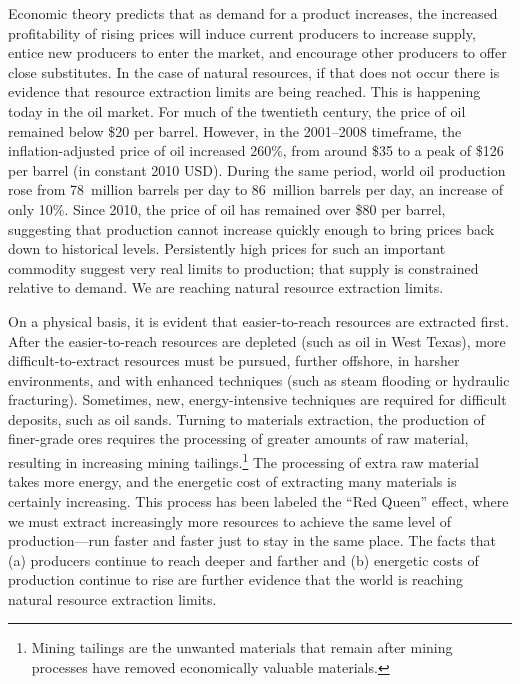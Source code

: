 Economic theory predicts that as demand for a product increases,
the increased profitability of rising prices 
will induce current producers to increase supply, 
entice new producers to enter the market,
and encourage other producers to offer close substitutes. 
In the case of natural resources, if that does not occur
there is evidence that resource extraction limits are being reached.
This is happening today in the oil market.
For much of the twentieth century, the price of oil remained below \$20 per barrel.
However, in the 2001--2008 timeframe,
the inflation-adjusted price of oil increased 260\%,
from around \$35 to a peak of \$126 per barrel 
(in constant 2010 USD).
During the same period,
world oil production rose from 
78~million barrels per day to 86~million barrels per day,
an increase of only 10\%.\cite{EIA2014}
Since 2010, the price of oil has remained over \$80 per barrel,
suggesting that production cannot increase quickly enough to bring prices
back down to historical levels.
Persistently high prices for such an important commodity
suggest very real limits to production; 
that supply is constrained relative to demand. 
We are reaching natural resource extraction limits.

On a physical basis, 
it is evident that easier-to-reach resources are extracted first. 
After the easier-to-reach resources are depleted (such as oil in West Texas),
more difficult-to-extract resources must be pursued,
further offshore,
in harsher environments, and
with enhanced techniques 
(such as steam flooding or hydraulic fracturing).
Sometimes, new, energy-intensive techniques are required 
for difficult deposits, such as oil sands.
Turning to materials extraction, the production of finer-grade ores
requires the processing of greater amounts of raw material, 
resulting in increasing mining tailings.\footnote{Mining tailings
	are the unwanted materials that remain after mining processes
	have removed economically valuable materials.\cite{Mudd2007}
	}
The processing of extra raw material takes more energy, and 
the energetic cost of extracting many materials is certainly increasing.\cite{Hall1986, Mudd2010, Hall2011}
This process has been labeled the ``Red Queen'' effect, 
where we must extract increasingly more resources to achieve the same
level of production---run faster and faster just to stay in 
the same place.\cite{Lees1975, Ross1988, Murray2013, Murphy2014}
The facts that (a) producers continue to reach deeper and farther 
and (b) energetic costs of production continue to rise
are further evidence that the world is reaching natural resource extraction limits.


